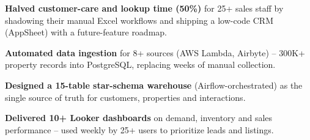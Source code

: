 
\vspace{1pt}
\begin{resume_list}
  \item \textbf{Halved customer-care and lookup time (50\%)} for 25+ sales staff by shadowing their manual Excel workflows and shipping a low-code CRM (AppSheet) with a future-feature roadmap.
  \item \textbf{Automated data ingestion} for 8+ sources (AWS Lambda, Airbyte) -- 300K+ property records into PostgreSQL, replacing weeks of manual collection.
  \item \textbf{Designed a 15-table star-schema warehouse} (Airflow-orchestrated) as the single source of truth for customers, properties and interactions.
  \item \textbf{Delivered 10+ Looker dashboards} on demand, inventory and sales performance -- used weekly by 25+ users to prioritize leads and listings.
\end{resume_list}
